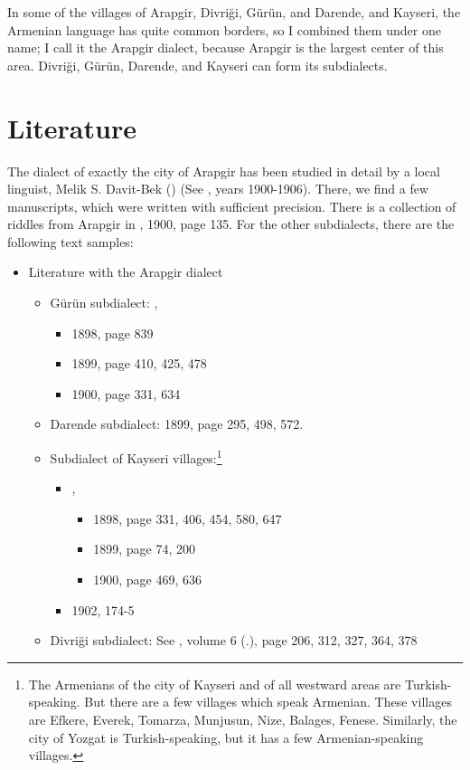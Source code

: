 In some of the villages of Arapgir, Divriği, Gürün, and Darende, and Kayseri, the Armenian language has quite common borders, so I combined them under one name; I call it the Arapgir dialect, because Arapgir is the largest center of this area. Divriği, Gürün, Darende, and Kayseri can form its subdialects.

\section{Literature}

The dialect of exactly the city of Arapgir has been studied in detail by a local linguist, Melik S. Davit-Bek () (See , years 1900-1906). There, we find a few manuscripts, which were written with sufficient precision. There is a collection of riddles from Arapgir in , 1900, page 135. For the other subdialects, there are the following text samples:



{\litoverview}

\begin{itemize}
	\item Literature with the Arapgir dialect
	\begin{itemize}
		\item Gürün subdialect: , 
		\begin{itemize}
			\item 1898, page 839 
			\item 1899, page 410, 425, 478 
			\item 1900, page 331, 634
			
		\end{itemize}
		
		\item Darende subdialect:  1899, page 295, 498, 572. 
		\item 
		Subdialect of Kayseri villages:\footnote{The Armenians of the city of Kayseri and of all westward areas are Turkish-speaking. But there are a few villages which speak Armenian. These villages are Efkere, Everek, Tomarza, Munjusun, Nize, Balages, Fenese. Similarly, the city of Yozgat is Turkish-speaking, but it has a few Armenian-speaking villages.} 
		\begin{itemize}
			\item {},
			\begin{itemize}
				\item 1898, page 331, 406, 454, 580, 647 
				\item 1899, page 74, 200 
				\item 1900, page 469, 636
			\end{itemize}
			\item {} 1902,  174-5
		\end{itemize}
		
		\item Divriği subdialect: See , volume 6 (.), page 206, 312, 327, 364, 378
		
	\end{itemize}
\end{itemize}



